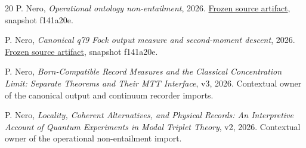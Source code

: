 \documentclass[11pt]{article}
\begin{document}
\begin{thebibliography}{20}
P. Nero, \emph{Operational ontology non-entailment}, 2026.
\href{https://github.com/PeterNero/mtt-results-repro/blob/f141a20ea23c5c3ff19cc2161c0e226e29ade8a7/release/results/q79_ontology_nonentailment/artifact.json}{Frozen source artifact}, snapshot f141a20e.

P. Nero, \emph{Canonical q79 Fock output measure and second-moment descent}, 2026.
\href{https://github.com/PeterNero/mtt-results-repro/blob/f141a20ea23c5c3ff19cc2161c0e226e29ade8a7/release/results/q79_fock_output_measure/artifact.json}{Frozen source artifact}, snapshot f141a20e.

P. Nero, \emph{Born-Compatible Record Measures and the Classical
Concentration Limit: Separate Theorems and Their MTT Interface}, v3, 2026.
Contextual owner of the canonical output and continuum recorder imports.

P. Nero, \emph{Locality, Coherent Alternatives, and Physical Records:
An Interpretive Account of Quantum Experiments in Modal Triplet Theory},
v2, 2026. Contextual owner of the operational non-entailment import.

\end{thebibliography}
\end{document}
